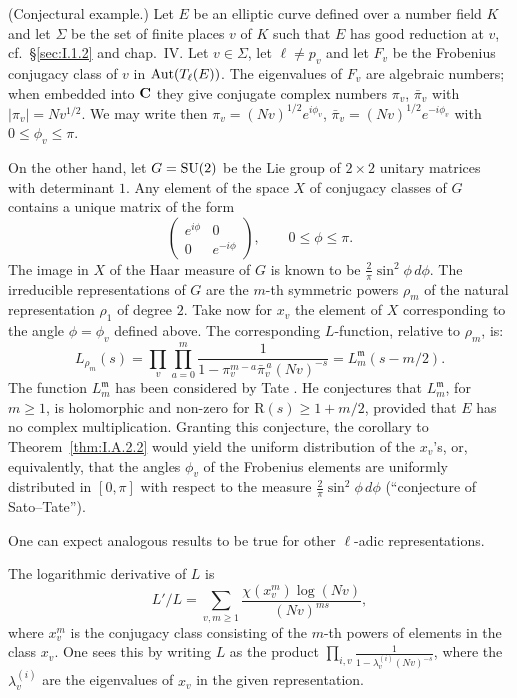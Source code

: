 \begin{remarks}
(Conjectural example.) Let $E$ be an elliptic curve defined over a number field $K$ and let $\Sigma$ be the set of finite places $v$ of $K$ such that $E$ has good reduction at $v$, cf.~\S\ref{sec:I.1.2} and chap.~IV. Let $v \in \Sigma$, let $\ell \neq p_v$ and let $F_v$ be the Frobenius conjugacy class of $v$ in $\mathrm{Aut}(T_\ell(E))$. The eigenvalues of $F_v$ are algebraic numbers; when embedded into $\mathbf{C}$ they give conjugate complex numbers $\pi_v$, $\bar{\pi}_v$ with $|\pi_v| = Nv^{1/2}$. We may write then $\pi_v = (Nv)^{1/2} e^{i\phi_v}$, $\bar{\pi}_v = (Nv)^{1/2} e^{-i\phi_v}$ with $0 \leq \phi_v \leq \pi$.

On the other hand, let $G = \operatorname{SU}(2)$ be the Lie group of $2 \times 2$ unitary matrices with determinant $1$. Any element of the space $X$ of conjugacy classes of $G$ contains a unique matrix of the form
\[
\begin{pmatrix}
e^{i\phi} & 0 \\ 0 & e^{-i\phi}
\end{pmatrix}, \qquad 0 \leq \phi \leq \pi.
\]
The image in $X$ of the Haar measure of $G$ is known to be $\frac{2}{\pi} \sin^2 \phi \, d\phi$. The irreducible representations of $G$ are the $m$-th symmetric powers $\rho_m$ of the natural representation $\rho_1$ of degree $2$. Take now for $x_v$ the element of $X$ corresponding to the angle $\phi = \phi_v$ defined above. The corresponding $L$-function, relative to $\rho_m$, is:
\[
L_{\rho_m}(s) = \prod_{v} \prod_{a=0}^{m} \frac{1}{1 - \pi_v^{m-a} \bar{\pi}_v^{\,a} (Nv)^{-s}} = L^{\mathfrak{m}}_m(s - m/2).
\]
The function $L^{\mathfrak{m}}_m$ has been considered by Tate \cite{tate-cycles}. He conjectures that $L^{\mathfrak{m}}_m$, for $m \geq 1$, is holomorphic and non-zero for $\mathrm{R}(s) \geq 1 + m/2$, provided that $E$ has no complex multiplication. Granting this conjecture, the corollary to Theorem~\ref{thm:I.A.2.2} would yield the uniform distribution of the $x_v$'s, or, equivalently, that the angles $\phi_v$ of the Frobenius elements are uniformly distributed in $[0,\pi]$ with respect to the measure $\frac{2}{\pi} \sin^2 \phi \, d\phi$ (``conjecture of Sato--Tate'').

One can expect analogous results to be true for other $\ell$-adic representations.
\end{remarks}


The logarithmic derivative of $L$ is
\[
L'/L = \sum_{v,m \geq 1} \frac{\chi(x_v^{m}) \log(Nv)}{(Nv)^{ms}},
\]
where $x_v^{m}$ is the conjugacy class consisting of the $m$-th powers of elements in the class $x_v$. One sees this by writing $L$ as the product $\prod_{i,v} \frac{1}{1 - \lambda_v^{(i)} (Nv)^{-s}}$, where the $\lambda_v^{(i)}$ are the eigenvalues of $x_v$ in the given representation.

